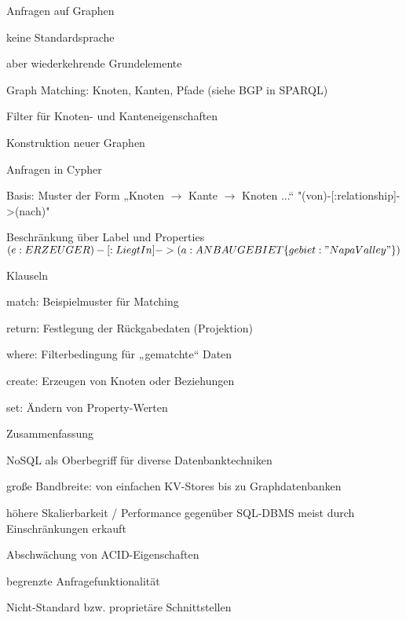 \documentclass[a4paper]{article}
\begin{document}
\begin{multicols}{3}
\begin{itemize*}
        Anfragen auf Graphen
        \begin{itemize*}
            \item keine Standardsprache
            \item aber wiederkehrende Grundelemente
            \begin{itemize*}
                \item Graph Matching: Knoten, Kanten, Pfade (siehe BGP in SPARQL)
                \item Filter für Knoten- und Kanteneigenschaften
                \item Konstruktion neuer Graphen
            \end{itemize*}
            \item Anfragen in Cypher
            \begin{itemize*}
                \item Basis: Muster der Form „Knoten $\rightarrow$ Kante $\rightarrow$ Knoten ...“ "(von)-[:relationship]->(nach)"
                \item Beschränkung über Label und Properties $(e:ERZEUGER)-[:LiegtIn]->(a:ANBAUGEBIET \{gebiet: "Napa Valley"\} )$
            \end{itemize*}
            \item Klauseln
            \begin{itemize*}
                \item match: Beispielmuster für Matching
                \item return: Festlegung der Rückgabedaten (Projektion)
                \item where: Filterbedingung für „gematchte“ Daten
                \item create: Erzeugen von Knoten oder Beziehungen
                \item set: Ändern von Property-Werten
            \end{itemize*}
        \end{itemize*}
    \end{itemize*}

    Zusammenfassung
    \begin{itemize*}
        \item NoSQL als Oberbegriff für diverse Datenbanktechniken
        \item große Bandbreite: von einfachen KV-Stores bis zu Graphdatenbanken
        \item höhere Skalierbarkeit / Performance gegenüber SQL-DBMS meist durch Einschränkungen erkauft
        \item Abschwächung von ACID-Eigenschaften
        \item begrenzte Anfragefunktionalität
        \item Nicht-Standard bzw. proprietäre Schnittstellen
    \end{itemize*}


\end{multicols}
\end{document}
